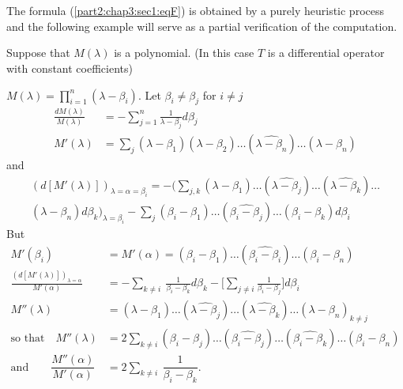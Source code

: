 \section{}\label{part2:chap3:sec2} %

The formula (\ref{part2:chap3:sec1:eqF}) is obtained by a purely heuristic process
and the following example will serve as a partial verification of the
computation. 

Suppose that $M (\lambda)$ is a polynomial. (In this case $T$ is a
differential operator with constant coefficients) 

$M(\lambda ) = \prod\limits_{i=1}^n (\lambda - \beta_i)$. Let $\beta_i
\neq \beta_j$ for $i \neq j$ 
\begin{align*}
  \frac{dM (\lambda )}{M(\lambda )} & = - \sum_{j=1}^n \frac{1}{\lambda
    - \beta_j} d \beta_j \\ 
  M' (\lambda ) & = \sum_j (\lambda - \beta_1 ) (\lambda - \beta_2 )
  \ldots (\widehat{\lambda - \beta_n})\ldots (\lambda - \beta_n ) 
\end{align*}
and 
\begin{multline*}
  (d [ M' (\lambda )])_{\lambda = \alpha = \beta_i} = - \Bigg(\sum_{j, k}
  (\lambda - \beta_1 )\ldots (\widehat{\lambda - \beta_j})  \ldots
  (\widehat{\lambda - \beta_k}) \ldots \\
  (\lambda - \beta_n ) d \beta_k
  \Bigg)_{\lambda = \beta_i}  - \sum_j (\beta_i - \beta_1 )\ldots
  (\widehat{\beta_i - \beta_j})   \ldots (\beta_i - \beta_k ) d \beta_i 
\end{multline*}
But\pageoriginale
\begin{align*}
  M' (\beta_i ) & = M' (\alpha ) = (\beta_i - \beta_1 ) \ldots
  (\widehat{\beta_i - \beta_i}) \ldots ( \beta_i - \beta_n ) \\
  \frac{(d[M' (\lambda )])_{\lambda = \alpha}}{M' (\alpha )} 
  &= -
  \sum_{k \neq i} ~ \frac{1}{\beta_i - \beta_k} d \beta_k - \Big[
    \sum_{j \neq i} \frac{1}{\beta_i - \beta_j} \Big] d \beta_i \\ 
  M'' (\lambda ) & = (\lambda - \beta_1 ) \ldots (\widehat{\lambda -
    \beta_j}) \ldots (\widehat{\lambda - \beta_k}) \ldots (\lambda -
  \beta_n )_{k \neq j}\\
  \text{so that}\quad M'' (\lambda ) & = 2 \sum\limits_{k \neq i}
  (\beta_i - \beta_j) \ldots (\widehat{\beta_i - \beta_j}) \ldots
  (\widehat{\beta_i - \beta_k}) \ldots (\beta_i - \beta_n) \\
  \text{and}\qquad \dfrac{M'' (\alpha )}{M' (\alpha )} & = 2
  \sum\limits_{k \neq i} ~ \dfrac{1}{\beta_i - \beta_k}. 
\end{align*}

